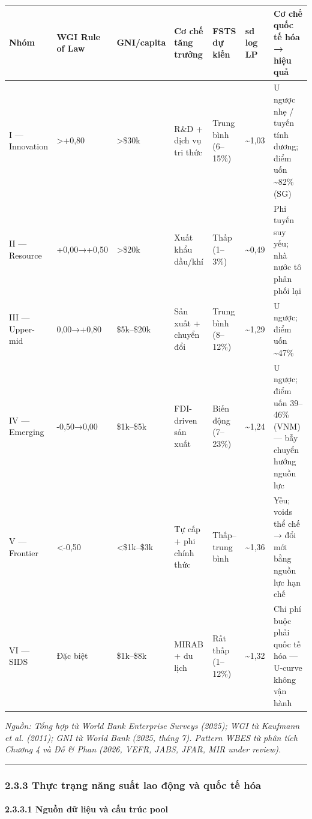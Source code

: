 \documentclass[12pt,a4paper]{article}
\begin{document}
\begin{longtable}[]{@{}lllllll@{}}
\toprule\noalign{}
Nhóm & WGI Rule of Law & GNI/capita & Cơ chế tăng trưởng & FSTS dự kiến
& sd log LP & Cơ chế quốc tế hóa → hiệu quả \\
\midrule\noalign{}
\endhead
\bottomrule\noalign{}
\endlastfoot
I --- Innovation & \textgreater+0,80 & \textgreater\$30k & R\&D + dịch
vụ tri thức & Trung bình (6--15\%) & \textasciitilde1,03 & U ngược nhẹ /
tuyến tính dương; điểm uốn \textasciitilde82\% (SG) \\
II --- Resource & +0,00→+0,50 & \textgreater\$20k & Xuất khẩu dầu/khí &
Thấp (1--3\%) & \textasciitilde0,49 & Phi tuyến suy yếu; nhà nước tô
phân phối lại \\
III --- Upper-mid & 0,00→+0,80 & \$5k--\$20k & Sản xuất + chuyển đổi &
Trung bình (8--12\%) & \textasciitilde1,29 & U ngược; điểm uốn
\textasciitilde47\% \\
IV --- Emerging & -0,50→0,00 & \$1k--\$5k & FDI-driven sản xuất & Biến
động (7--23\%) & \textasciitilde1,24 & U ngược; điểm uốn 39--46\% (VNM)
--- bẫy chuyển hướng nguồn lực \\
V --- Frontier & \textless-0,50 & \textless\$1k--\$3k & Tự cấp + phi
chính thức & Thấp--trung bình & \textasciitilde1,36 & Yếu; voids thể chế
→ đổi mới bằng nguồn lực hạn chế \\
VI --- SIDS & Đặc biệt & \$1k--\$8k & MIRAB + du lịch & Rất thấp
(1--12\%) & \textasciitilde1,32 & Chi phí buộc phải quốc tế hóa ---
U-curve không vận hành \\
\end{longtable}

\emph{Nguồn: Tổng hợp từ World Bank Enterprise Surveys (2025); WGI từ
Kaufmann et al. (2011); GNI từ World Bank (2025, tháng 7). Pattern WBES
từ phân tích Chương 4 và Đỗ \& Phan (2026, VEFR, JABS, JFAR, MIR under
review).}

\begin{center}\rule{0.5\linewidth}{0.5pt}\end{center}

\hypertarget{233-thux1ef1c-trux1ea1ng-nux103ng-suux1ea5t-lao-ux111ux1ed9ng-vuxe0-quux1ed1c-tux1ebf-huxf3a}{%
\subsubsection{2.3.3 Thực trạng năng suất lao động và quốc tế
hóa}\label{233-thux1ef1c-trux1ea1ng-nux103ng-suux1ea5t-lao-ux111ux1ed9ng-vuxe0-quux1ed1c-tux1ebf-huxf3a}}

\hypertarget{2331-nguux1ed3n-dux1eef-liux1ec7u-vuxe0-cux1ea5u-truxfac-pool}{%
\paragraph{2.3.3.1 Nguồn dữ liệu và cấu trúc
pool}\label{2331-nguux1ed3n-dux1eef-liux1ec7u-vuxe0-cux1ea5u-truxfac-pool}}
\end{document}
